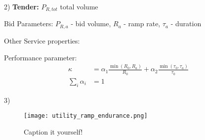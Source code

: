 2) \textbf{Tender:}
$P_{R,tot}$ total volume

Bid Parameters: 
$P_{R,a}$ - bid volume, $R_{a}$ - ramp rate, $\tau_a$ - duration 


Other Service properties:

Performance parameter:
\begin{align}
\kappa &= \alpha_1 \frac{\min({R_{0},R_a})}{R_0} + \alpha_2  \frac{\min(\tau_0,\tau_{a})}{\tau_{0}}\label{eq:kappa2}\\
\sum_i\alpha_i &=1
\end{align}

3) 

\begin{figure}[htb!]
\centering
\texttt{[image: utility\_ramp\_endurance.png]}
\caption{Caption it yourself!}
\label{fig:utrend}
\end{figure}